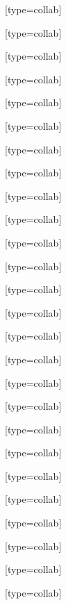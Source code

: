 \author[38]{L.,~Kumar}[type=collab]

\author[21]{V.,~Kyva}[type=collab]

\author[10]{R.,~Lakos}[type=collab]

\author[19]{R.,~Lalik}[type=collab]

\author[19]{P.,~Lasko}[type=collab]

\author[22]{E.,~Lavrik}[type=collab]

\author[9]{I.,~Lazanu}[type=collab]

\author[5]{J.,~Lehnert}[type=collab]

\author[30]{Y.H.,~Leung}[type=collab]

\author[24]{S.,~Li}[type=collab]

\author[39]{W.,~Li}[type=collab]

\author[29]{Y.,~Li}[type=collab]

\author[10]{V.,~Lindenstruth}[type=collab]

\author[5]{F.J.,~Linz}[type=collab]

\author[32]{F.,~Liu}[type=collab]

\author[5]{S.,~Löchner}[type=collab]

\author[5]{P.-A.,~Loizeau}[type=collab]

\author[6]{M.,~Lorenz}[type=collab]

\author[5]{O.,~Lubynets}[type=collab]

\author[32]{X.,~Luo}[type=collab]

\author[5]{A.,~Lymanets}[type=collab]

\author[13]{S.,~Mahajan}[type=collab]

\author[19]{Z.,~Majka}[type=collab]

\author[40]{B.,~Mallick}[type=collab]

\author[17]{S.,~Mandal}[type=collab]

\author[32]{Y.,~Mao}[type=collab]

